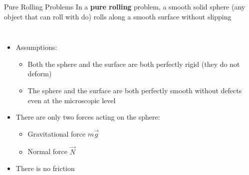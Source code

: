 \documentclass[12pt,compress,aspectratio=169]{beamer}
\begin{document}
\begin{frame}{Pure Rolling Problems}
  In a \textbf{pure rolling} problem, a smooth solid sphere (any object that
  can roll with do) rolls along a smooth surface without slipping
  \begin{columns}
    \centering

    \begin{itemize}
    \item Assumptions:
      \begin{itemize}
      \item Both the sphere and the surface are both perfectly rigid (they
        do not deform)
      \item The sphere and the surface are both perfectly smooth without defects
        even at the microscopic level
      \end{itemize}
    \item There are only two forces acting on the sphere:
      \begin{itemize}
      \item Gravitational force $m\vec g$
      \item Normal force $\vec N$
      \end{itemize}
    \item There is no friction
    \end{itemize}
  \end{columns}
\end{frame}
\end{document}
